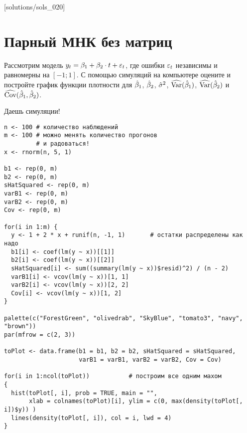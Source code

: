 [solutions/sols_020]

\chapter{Парный МНК без матриц}


\begin{problem}
Рассмотрим модель $y_t=\b_1+\b_2 \cdot t + \e_t$, где ошибки $\e_t$ независимы и равномерны на $[-1;1]$. С помощью симуляций на компьютере оцените и постройте график функции плотности для $\hb_1$, $\hb_2$, $\hs^2$, $\hVar(\hb_1)$, $\hVar(\hb_2)$ и $\hCov(\hb_1,\hb_2)$.


\begin{sol}
Даешь симуляции!

\begin{verbatim}
n <- 100 # количество наблюдений
m <- 100 # можно менять количество прогонов
         # и радоваться!
x <- rnorm(n, 5, 1)

b1 <- rep(0, m)
b2 <- rep(0, m)
sHatSquared <- rep(0, m)
varB1 <- rep(0, m)
varB2 <- rep(0, m)
Cov <- rep(0, m)

for(i in 1:m) {
  y <- 1 + 2 * x + runif(n, -1, 1)       # остатки распределены как надо
  b1[i] <- coef(lm(y ~ x))[[1]]
  b2[i] <- coef(lm(y ~ x))[[2]]
  sHatSquared[i] <- sum((summary(lm(y ~ x))$resid)^2) / (n - 2)
  varB1[i] <- vcov(lm(y ~ x))[1, 1]
  varB2[i] <- vcov(lm(y ~ x))[2, 2]
  Cov[i] <- vcov(lm(y ~ x))[1, 2]
}

palette(c("ForestGreen", "olivedrab", "SkyBlue", "tomato3", "navy", "brown"))
par(mfrow = c(2, 3))

toPlot <- data.frame(b1 = b1, b2 = b2, sHatSquared = sHatSquared,
                     varB1 = varB1, varB2 = varB2, Cov = Cov)

for(i in 1:ncol(toPlot))           # построим все одним махом
{
  hist(toPlot[, i], prob = TRUE, main = "",
       xlab = colnames(toPlot)[i], ylim = c(0, max(density(toPlot[, i])$y)) )
  lines(density(toPlot[, i]), col = i, lwd = 4)
}
\end{verbatim}

\begin{minipage}{0.6\textwidth}
\begin{center}
\begin{tikzpicture}[scale = 0.025]

\end{tikzpicture}
\end{center}
\end{minipage}

\end{sol}
\end{problem}



